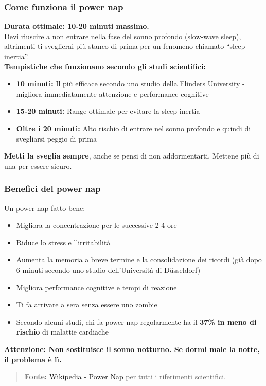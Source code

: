 \documentclass{article}
\begin{document}
\subsubsection{Come funziona il power nap}
\textbf{Durata ottimale: 10-20 minuti massimo.}\\
Devi riuscire a non entrare nella fase del sonno profondo (slow-wave sleep), altrimenti ti sveglierai più stanco di prima per un fenomeno chiamato ``sleep inertia''.\\
\textbf{Tempistiche che funzionano secondo gli studi scientifici:}
\begin{itemize}
\item \textbf{10 minuti:} Il più efficace secondo uno studio della Flinders University - migliora immediatamente attenzione e performance cognitive
\item \textbf{15-20 minuti:} Range ottimale per evitare la sleep inertia
\item \textbf{Oltre i 20 minuti:} Alto rischio di entrare nel sonno profondo e quindi di svegliarsi peggio di prima
\end{itemize}%
\textbf{Metti la sveglia sempre}, anche se pensi di non addormentarti. Mettene più di una per essere sicuro.


\subsubsection{Benefici del power nap}
Un power nap fatto bene:
\begin{itemize}
\item Migliora la concentrazione per le successive 2-4 ore
\item Riduce lo stress e l'irritabilità
\item Aumenta la memoria a breve termine e la consolidazione dei ricordi (già dopo 6 minuti secondo uno studio dell'Università di Düsseldorf)
\item Migliora performance cognitive e tempi di reazione
\item Ti fa arrivare a sera senza essere uno zombie
\item Secondo alcuni studi, chi fa power nap regolarmente ha il \textbf{37\% in meno di rischio} di malattie cardiache
\end{itemize}
\textbf{Attenzione: Non sostituisce il sonno notturno. Se dormi male la notte, il problema è lì.}
\begin{quote}
\textbf{Fonte:} \href{https://en.wikipedia.org/wiki/Power_nap}{Wikipedia - Power Nap} per tutti i riferimenti scientifici.
\end{quote}
\end{document}
